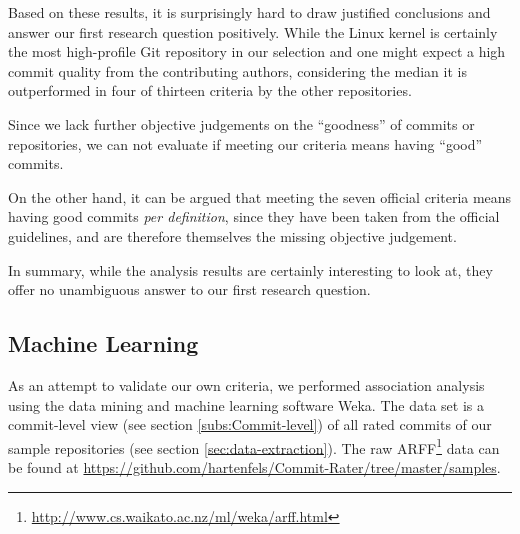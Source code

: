 Based on these results, it is surprisingly hard to draw justified conclusions and answer our first research question positively. While the Linux kernel is certainly the most high-profile Git repository in our selection and one might expect a high commit quality from the contributing authors, considering the median it is outperformed in four of thirteen criteria by the other repositories.

Since we lack further objective judgements on the ``goodness'' of commits or repositories, we can not evaluate if meeting our criteria means having ``good'' commits.

On the other hand, it can be argued that meeting the seven official criteria means having good commits \emph{per definition}, since they have been taken from the official guidelines, and are therefore themselves the missing objective judgement.

In summary, while the analysis results are certainly interesting to look at, they offer no unambiguous answer to our first research question.

\subsection{Machine Learning}
\label{sec:results2}

As an attempt to validate our own criteria, we performed association analysis using the data mining and machine learning software Weka\cite{Weka}. The data set is a commit-level view (see section \ref{subs:Commit-level}) of all rated commits of our sample repositories (see section \ref{sec:data-extraction}). The raw ARFF\footnote{\url{http://www.cs.waikato.ac.nz/ml/weka/arff.html}} data can be found at \url{https://github.com/hartenfels/Commit-Rater/tree/master/samples}.

